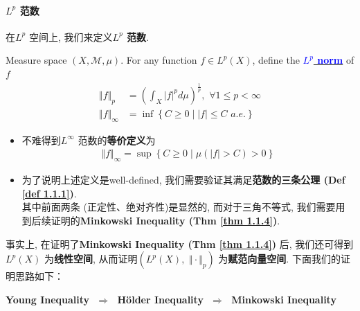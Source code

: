 \paragraph{$L^p$ 范数}
	在$L^{p}$ 空间上, 我们来定义\textbf{$L^p$ 范数}.
	\begin{defn}\label{def 1.1.4}
		Measure space $(X , \mathcal{M} , \mu)$. For any function $f \in L^{p}(X)$, define the \underline{\textcolor{blue}{\textbf{$L^p$ norm}}} of $f$
		\begin{align}
			\Vert f \Vert_{p} &= \left( \int_{X}{\left| f \right|^p d\mu} \right)^{\frac{1}{p}} , \,\, \forall 1 \leq p < \infty \\
			\Vert f \Vert_\infty &= \inf{\left\{ C \geq 0 \mid \left| f \right| \leq C \,\, a.e. \right\}}
		\end{align}
		
		\vspace{2em}
		\begin{rmk}
			\begin{itemize}
				\item 不难得到$L^\infty$ 范数的\textbf{等价定义}为
				\begin{align}
					\Vert f \Vert_\infty = \sup{\left\{ C \geq 0 \mid \mu(\left| f \right| > C ) > 0 \right\}}
				\end{align}
			
				\vspace{1em}
				
				\item 为了说明上述定义是well-defined, 我们需要验证其满足\textbf{范数的三条公理 (Def \ref{def 1.1.1})}. \\
				其中前面两条 (正定性、绝对齐性)是显然的, 而对于三角不等式, 我们需要用到后续证明的\textbf{Minkowski Inequality (Thm \ref{thm 1.1.4})}.
			\end{itemize}
		\end{rmk}
	\end{defn}
	
	\vspace{4em}
	事实上, 在证明了\textbf{Minkowski Inequality (Thm \ref{thm 1.1.4})} 后, 我们还可得到$L^{p}(X)$ 为\textbf{线性空间}, 从而证明$(L^{p}(X) , \,\, \Vert \cdot \Vert_p)$ 为\textbf{赋范向量空间}. 下面我们的证明思路如下：
	\begin{center}
		\textbf{Young Inequality} $\,\, \Rightarrow \,\,$ \textbf{H\"{o}lder Inequality} $\,\, \Rightarrow \,\,$ \textbf{Minkowski Inequality}
	\end{center}

\newpage
